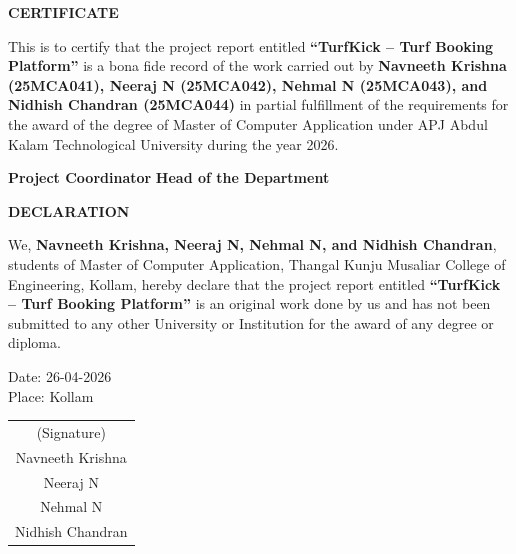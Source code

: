 \documentclass[12pt]{report}
\begin{document}
\newpage
\thispagestyle{empty}
\begin{center}
    {\huge \textbf{CERTIFICATE} \par}
    \vspace{2cm}
    \begin{center}
        This is to certify that the project report entitled \textbf{``TurfKick -- Turf Booking Platform''} is a bona fide record of the work carried out by \textbf{Navneeth Krishna (25MCA041), Neeraj N (25MCA042), Nehmal N (25MCA043), and Nidhish Chandran (25MCA044)} in partial fulfillment of the requirements for the award of the degree of Master of Computer Application under APJ Abdul Kalam Technological University during the year 2026.
    \end{center}
\end{center}

\vspace{3cm}
\begin{flushleft}
    \textbf{Project Coordinator} \hfill \textbf{Head of the Department}
\end{flushleft}

\newpage
\begin{center}
    {\huge \textbf{DECLARATION} \par}
\end{center}
\vspace{2cm}
We, \textbf{Navneeth Krishna, Neeraj N, Nehmal N, and Nidhish Chandran}, students of Master of Computer Application, Thangal Kunju Musaliar College of Engineering, Kollam, hereby declare that the project report entitled \textbf{``TurfKick -- Turf Booking Platform''} is an original work done by us and has not been submitted to any other University or Institution for the award of any degree or diploma.

\vspace{2cm}
\begin{flushleft}
    Date: 26-04-2026 \\
    Place: Kollam
\end{flushleft}
\hfill
\begin{tabular}{c}
    (Signature) \\
    Navneeth Krishna \\
    Neeraj N \\
    Nehmal N \\
    Nidhish Chandran \\
\end{tabular}
\end{document}
